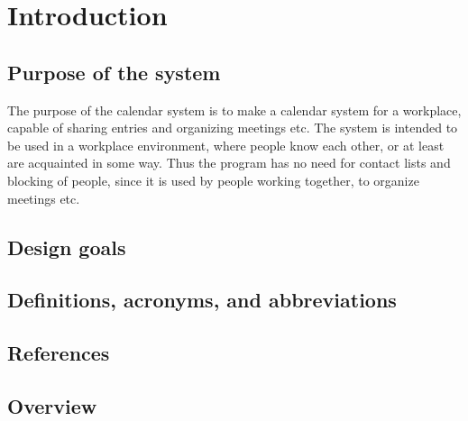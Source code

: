 \section{Introduction}
\subsection{Purpose of the system}
The purpose of the calendar system is to make a calendar system for a workplace, capable of sharing entries and organizing meetings etc.
The system is intended to be used in a workplace environment, where people know each other, or at least are acquainted in some way. Thus the program has no need for contact lists and blocking of people, since it is used by people working together, to organize meetings etc.
\subsection{Design goals}
\subsection{Definitions, acronyms, and abbreviations}
\subsection{References}
\subsection{Overview}